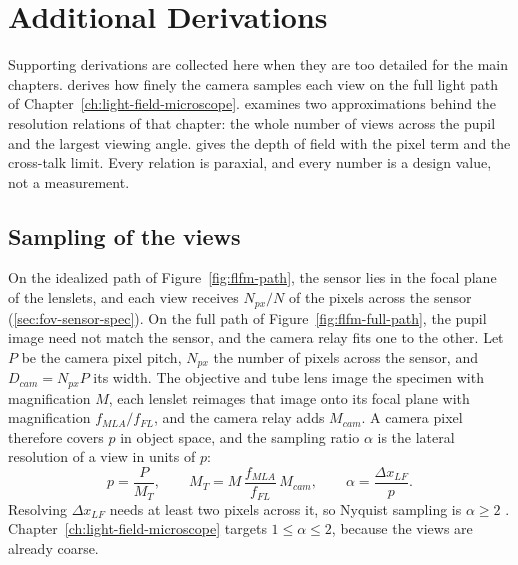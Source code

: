 \chapter{Additional Derivations}
\label{app:derivations}

Supporting derivations are collected here when they are too detailed for the main chapters.  derives how finely the camera samples each view on the full light path of Chapter~\ref{ch:light-field-microscope}.  examines two approximations behind the resolution relations of that chapter: the whole number of views across the pupil and the largest viewing angle.  gives the depth of field with the pixel term and the cross-talk limit. Every relation is paraxial, and every number is a design value, not a measurement.


\section{Sampling of the views}
\label{sec:app-sampling}

On the idealized path of Figure~\ref{fig:flfm-path}, the sensor lies in the focal plane of the lenslets, and each view receives $N_{px}/N$ of the pixels across the sensor (\cref{sec:fov-sensor-spec}). On the full path of Figure~\ref{fig:flfm-full-path}, the pupil image need not match the sensor, and the camera relay fits one to the other. Let $P$ be the camera pixel pitch, $N_{px}$ the number of pixels across the sensor, and $D_{cam}=N_{px}P$ its width. The objective and tube lens image the specimen with magnification $M$, each lenslet reimages that image onto its focal plane with magnification $f_{MLA}/f_{FL}$, and the camera relay adds $M_{cam}$. A camera pixel therefore covers $p$ in object space, and the sampling ratio $\alpha$ is the lateral resolution of a view in units of $p$:
\begin{equation}
    p = \frac{P}{M_T}, \qquad
    M_T = M\,\frac{f_{MLA}}{f_{FL}}\,M_{cam}, \qquad
    \alpha = \frac{\Delta x_{LF}}{p}.
    \label{eq:app-sampling-def}
\end{equation}
Resolving $\Delta x_{LF}$ needs at least two pixels across it, so Nyquist sampling is $\alpha\ge2$ \cite{guo2019fourierLightField}. Chapter~\ref{ch:light-field-microscope} targets $1\le\alpha\le2$, because the views are already coarse.

